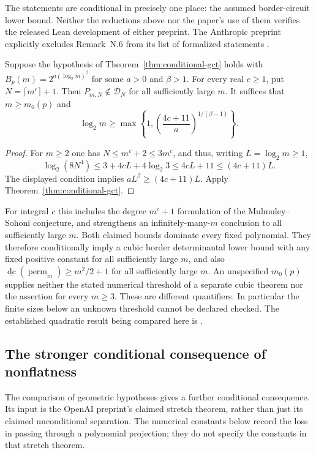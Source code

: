 The statements are conditional in precisely one place: the assumed
border-circuit lower bound.  Neither the reductions above nor the
paper's use of them verifies the released Lean development of
either preprint.  The Anthropic preprint explicitly excludes
Remark~N.6 from its list of formalized statements
\cite[Section~3, p.~10; Table~3, p.~67]{Anthropic2026}.

\begin{corollary}
\label{cor:fixed-padding}
Suppose the hypothesis of Theorem~\ref{thm:conditional-gct}
holds with $B_p(m)=2^{a(\log_2m)^\beta}$ for some $a>0$ and
$\beta>1$.  For every real $c\geq1$, put
$N=\lceil m^c\rceil+1$.  Then $P_{m,N}\notin\mathcal D_N$
for all sufficiently large $m$.  It suffices that $m\geq m_0(p)$
and
\[
 \log_2m\geq
 \max\left\{1,
       \left(\frac{4c+11}{a}\right)^{1/(\beta-1)}\right\}.
\]
\end{corollary}

\begin{proof}
For $m\geq2$ one has $N\leq m^c+2\leq3m^c$, and thus,
writing $L=\log_2m\geq1$,
\[
 \log_2(8N^4)\leq3+4cL+4\log_2 3
     \leq4cL+11\leq(4c+11)L.
\]
The displayed condition implies $aL^\beta\geq(4c+11)L$.
Apply Theorem~\ref{thm:conditional-gct}.
\end{proof}

For integral $c$ this includes the degree $m^c+1$ formulation of
the Mulmuley--Sohoni conjecture, and strengthens an
infinitely-many-$m$ conclusion to all sufficiently large $m$.
Both claimed bounds dominate every fixed polynomial.  They
therefore conditionally imply a cubic border determinantal lower
bound with any fixed positive constant for all sufficiently large
$m$, and also
$\underline{\operatorname{dc}}(\operatorname{perm}_m)
\geq m^2/2+1$ for all sufficiently large $m$.
An unspecified $m_0(p)$ supplies neither the stated numerical
threshold of a separate cubic theorem nor the assertion for
every $m\geq3$.  These are different quantifiers.  In particular
the finite sizes below an unknown threshold cannot be declared
checked.  The established quadratic result being compared here
is \cite[Theorem~1.0.1]{LandsbergManivelRessayre2013}.

\subsection{The stronger conditional consequence of nonflatness}

The comparison of geometric hypotheses gives a further conditional
consequence.  Its input is the OpenAI preprint's claimed stretch
theorem, rather than just its claimed unconditional separation.
The numerical constants below record the loss in passing through
a polynomial projection; they do not specify the constants in
that stretch theorem.

